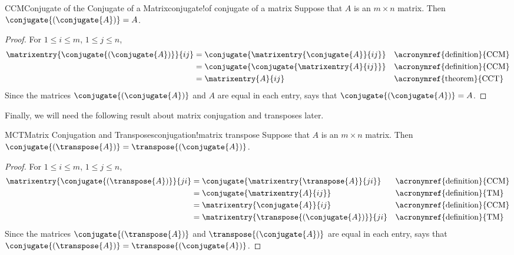%
%
\begin{theorem}{CCM}{Conjugate of the Conjugate of a Matrix}{conjugate!of conjugate of a matrix}
Suppose that $A$ is an $m\times n$ matrix.  Then $\conjugate{\left(\conjugate{A}\right)}=A$.
\end{theorem}
%
\begin{proof}
For $1\leq i\leq m$, $1\leq j\leq n$,
%
\begin{align*}
%
\matrixentry{\conjugate{\left(\conjugate{A}\right)}}{ij}
&=\conjugate{\matrixentry{\conjugate{A}}{ij}}&&\text{\acronymref{definition}{CCM}}\\
&=\conjugate{\conjugate{\matrixentry{A}{ij}}}&&\text{\acronymref{definition}{CCM}}\\
&=\matrixentry{A}{ij}&&\text{\acronymref{theorem}{CCT}}%
\end{align*}
%
Since the matrices  $\conjugate{\left(\conjugate{A}\right)}$ and $A$  are equal in each entry,  says that $\conjugate{\left(\conjugate{A}\right)}=A$.
%
\end{proof}
%
Finally, we will need the following result about matrix conjugation and transposes later.
%
\begin{theorem}{MCT}{Matrix Conjugation and Transposes}{conjugation!matrix transpose}
Suppose that $A$ is an $m\times n$ matrix.  Then $\conjugate{\left(\transpose{A}\right)}=\transpose{\left(\conjugate{A}\right)}$.
\end{theorem}
%
\begin{proof}
%
For $1\leq i\leq m$, $1\leq j\leq n$,
%
\begin{align*}
%
\matrixentry{\conjugate{\left(\transpose{A}\right)}}{ji}
%
&=\conjugate{\matrixentry{\transpose{A}}{ji}}
&&\text{\acronymref{definition}{CCM}}\\
%
&=\conjugate{\matrixentry{A}{ij}}
&&\text{\acronymref{definition}{TM}}\\
%
&=\matrixentry{\conjugate{A}}{ij}
&&\text{\acronymref{definition}{CCM}}\\
%
&=\matrixentry{\transpose{\left(\conjugate{A}\right)}}{ji}
&&\text{\acronymref{definition}{TM}}\\
%
\end{align*}
%
Since the matrices  $\conjugate{\left(\transpose{A}\right)}$ and $\transpose{\left(\conjugate{A}\right)}$  are equal in each entry,  says that $\conjugate{\left(\transpose{A}\right)}=\transpose{\left(\conjugate{A}\right)}$.
%
\end{proof}
%
